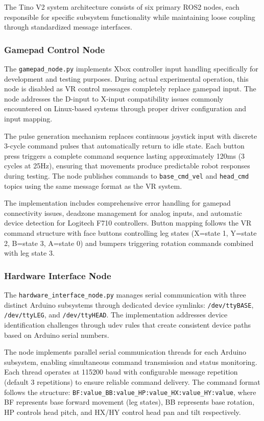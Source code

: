 The Tino V2 system architecture consists of six primary ROS2 nodes, each responsible for specific subsystem functionality while maintaining loose coupling through standardized message interfaces.

\subsubsection{Gamepad Control Node}

The \texttt{gamepad\_node.py} implements Xbox controller input handling specifically for development and testing purposes. During actual experimental operation, this node is disabled as VR control messages completely replace gamepad input. The node addresses the D-input to X-input compatibility issues commonly encountered on Linux-based systems through proper driver configuration and input mapping.

The pulse generation mechanism replaces continuous joystick input with discrete 3-cycle command pulses that automatically return to idle state. Each button press triggers a complete command sequence lasting approximately 120ms (3 cycles at 25Hz), ensuring that movements produce predictable robot responses during testing. The node publishes commands to \texttt{base\_cmd\_vel} and \texttt{head\_cmd} topics using the same message format as the VR system.

The implementation includes comprehensive error handling for gamepad connectivity issues, deadzone management for analog inputs, and automatic device detection for Logitech F710 controllers. Button mapping follows the VR command structure with face buttons controlling leg states (X=state 1, Y=state 2, B=state 3, A=state 0) and bumpers triggering rotation commands combined with leg state 3.

\subsubsection{Hardware Interface Node}

The \texttt{hardware\_interface\_node.py} manages serial communication with three distinct Arduino subsystems through dedicated device symlinks: \texttt{/dev/ttyBASE}, \texttt{/dev/ttyLEG}, and \texttt{/dev/ttyHEAD}. The implementation addresses device identification challenges through udev rules that create consistent device paths based on Arduino serial numbers.

The node implements parallel serial communication threads for each Arduino subsystem, enabling simultaneous command transmission and status monitoring. Each thread operates at 115200 baud with configurable message repetition (default 3 repetitions) to ensure reliable command delivery. The command format follows the structure: \texttt{BF:value\_BB:value\_HP:value\_HX:value\_HY:value}, where BF represents base forward movement (leg states), BB represents base rotation, HP controls head pitch, and HX/HY control head pan and tilt respectively.

